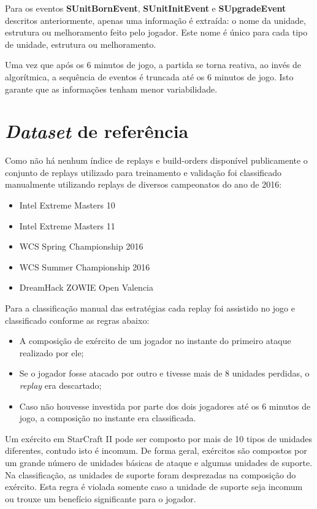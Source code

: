 Para os eventos \textbf{SUnitBornEvent}, \textbf{SUnitInitEvent} e \textbf{SUpgradeEvent} descritos anteriormente, apenas uma informação é extraída: o nome da unidade, estrutura ou melhoramento feito pelo jogador. Este nome é único para cada tipo de unidade, estrutura ou melhoramento.

Uma vez que após os 6 minutos de jogo, a partida se torna reativa, ao invés de algorítmica, a sequência de eventos é truncada até os 6 minutos de jogo. Isto garante que as informações tenham menor variabilidade. 

\section{\textit{Dataset} de referência}
Como não há nenhum índice de replays e build-orders disponível publicamente o conjunto de replays utilizado para treinamento e validação foi classificado manualmente utilizando replays de diversos campeonatos do ano de 2016:

\begin{itemize}
	\item Intel Extreme Masters 10
	\item Intel Extreme Masters 11
	\item WCS Spring Championship 2016
	\item WCS Summer Championship 2016
	\item DreamHack ZOWIE Open Valencia
\end{itemize}

Para a classificação manual das estratégias cada replay foi assistido no jogo e classificado conforme as regras abaixo:

\begin{itemize}
	\item A composição de exército de um jogador no instante do primeiro ataque realizado por ele;
	\item Se o jogador fosse atacado por outro e tivesse mais de 8 unidades perdidas, o \textit{replay} era descartado;
	\item Caso não houvesse investida por parte dos dois jogadores até os 6 minutos de jogo, a composição no instante era classificada.
\end{itemize}

Um exército em StarCraft II pode ser composto por mais de 10 tipos de unidades diferentes, contudo isto é incomum. De forma geral, exércitos são compostos por um grande número de unidades básicas de ataque e algumas unidades de suporte. Na classificação, as unidades de suporte foram desprezadas na composição do exército. Esta regra é violada somente caso a unidade de suporte seja incomum ou trouxe um benefício significante para o jogador.

